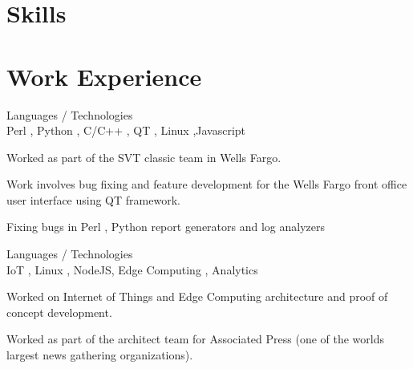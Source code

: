 \documentclass[a4,11pt]{cv4tw}
\begin{document}
\section{Skills}

\begin{skills}{}
\end{skills}


\section{Work Experience}
{Languages / Technologies \\Perl , Python , C/C++ , QT , Linux ,Javascript}
	{ 
	\begin{missions}
		\item Worked as part of the SVT classic team in Wells Fargo.
		\item Work involves bug fixing and feature development for the Wells Fargo front office user interface using QT framework.
		\item Fixing bugs in Perl , Python report generators and log analyzers
	\end{missions}
}


{Languages / Technologies \\ IoT , Linux , NodeJS, Edge Computing , Analytics }
	{ 
	\begin{missions}
		\item Worked on Internet of Things and Edge Computing architecture and proof of concept development.
		\item Worked as part of the architect team for Associated Press (one of the worlds largest news gathering organizations). 
	\end{missions}
}
\end{document}
